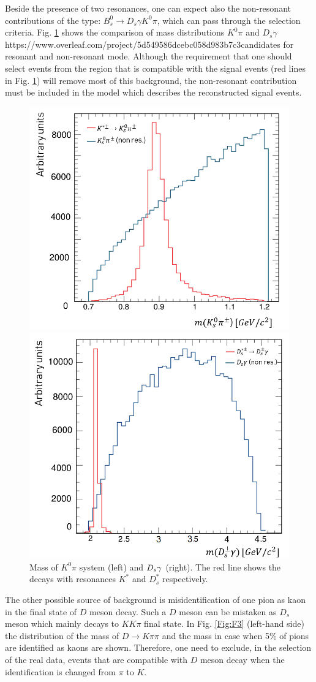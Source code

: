 \documentclass{appolb}
\begin{document}
Beside the presence of two resonances, one can expect also the non-resonant contributions of the type: $B^0_s \rightarrow D_s \gamma  K^0 \pi$,  which can pass through the selection criteria.  Fig. \ref{Fig:F2} shows the comparison of mass distributions $K^0 \pi$ and $D_s \gamma$ https://www.overleaf.com/project/5d549586dcebc058d983b7c3candidates for resonant and non-resonant mode. Although the requirement that one should select events from the region that is compatible with the signal events (red lines in Fig. \ref{Fig:F2}) will remove most of this background, the non-resonant contribution must be included in the model which describes the reconstructed signal events.
\begin{figure}[htbp]
\centering
\begin{minipage}{0.5\textwidth}
  \centering
\includegraphics[width=6.5 cm]{Kstar.png}
\end{minipage}%
\begin{minipage}{0.5\textwidth}
  \centering
\includegraphics[width= 6.5 cm]{Dstar.png}
\end{minipage}%
\caption{Mass  of $K^0 \pi$ system (left) and $D_s {\gamma}$ (right).
The red line shows the decays with resonances $K^*$ and $D_s^*$ respectively.} 
\label{Fig:F2}
\end{figure}

The other possible source of background is misidentification of one pion as kaon in the final state of $D$ meson decay. Such a $D$ meson can be mistaken as $D_s$ meson which mainly decays to $K K \pi$ final state. In Fig. \ref{Fig:F3} (left-hand side) the distribution of the mass of $D \rightarrow K \pi \pi$ and the mass in case when 5\% of pions are identified as kaons are shown. Therefore, one need to exclude, in the selection of the real data, events that are compatible with $D$ meson decay when the identification is changed from $\pi$  to $K$.  
\end{document}
